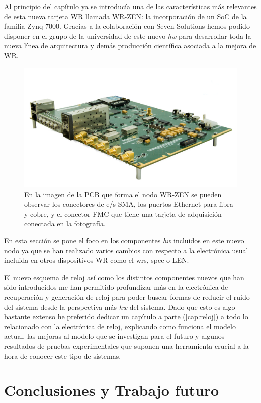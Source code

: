Al principio del capítulo ya se introducía una de las características más 
relevantes de esta nueva tarjeta WR llamada WR-ZEN: la incorporación de un SoC 
de la familia Zynq-7000. Gracias a la colaboración con Seven Solutions hemos 
podido disponer en el grupo de la universidad de este nuevo \textit{hw} para 
desarrollar toda la nueva línea de arquitectura y demás producción científica 
asociada a la mejora de WR.

\begin{figure}
	\centering
	\includegraphics[width=0.7\linewidth]{imagenes/wrzen}
	\caption[Foto de la tarjeta WR-ZEN]{En la imagen de la PCB que forma el 
	nodo WR-ZEN se pueden observar los conectores de e/s SMA, los puertos 
	Ethernet para fibra y cobre, y el conector FMC que tiene una tarjeta de 
	adquisición conectada en la fotografía.}
	\label{fig:wrzen}
\end{figure}

En esta sección se pone el foco en los componentes \textit{hw} incluidos en 
este nuevo nodo ya que se han realizado varios cambios con respecto a la 
electrónica usual incluida en otros dispositivos WR como el \gls{wrs}, 
\gls{spec} o LEN.


El nuevo esquema de reloj así como los distintos componentes nuevos que han 
sido introducidos me han permitido profundizar más en la electrónica de 
recuperación y generación de reloj para poder buscar formas de reducir el ruido 
del sistema desde la perspectiva más \textit{hw} del sistema. Dado que esto es 
algo bastante extenso he preferido dedicar un capítulo a parte 
(\ref{cap:reloj}) a todo lo relacionado 
con la electrónica de reloj, explicando como funciona el modelo actual, las 
mejoras al modelo que se investigan para el futuro y algunos resultados de 
pruebas experimentales que suponen una herramienta crucial a la hora de conocer 
este tipo de sistemas.

\section{Conclusiones y Trabajo futuro} \label{sec:socfuturo}

